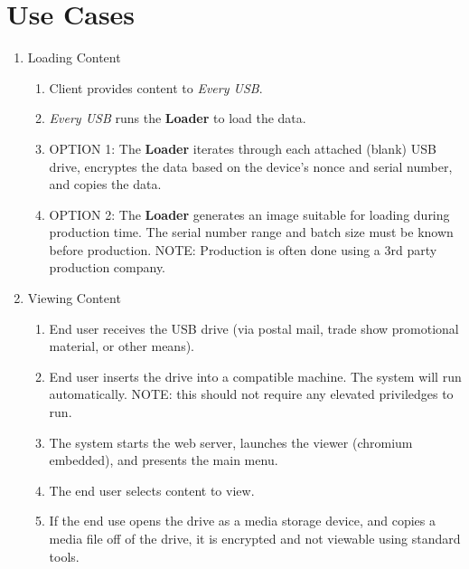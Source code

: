 \documentclass{article}
\begin{document}
\section{Use Cases}

\begin{enumerate}
\item Loading Content
    \begin{enumerate}
    \item Client provides content to {\it Every USB}.
    \item {\it Every USB} runs the {\bf Loader} to load the data.
    \item OPTION 1: The {\bf Loader} iterates through each attached
          (blank) USB drive, encryptes the data based on the device's nonce
          and serial number, and copies the data.
    \item OPTION 2: The {\bf Loader} generates an image suitable for
          loading during production time.  The serial number range and
          batch size must be known before production.  NOTE: Production
          is often done using a 3rd party production company.
    \end{enumerate}

\item Viewing Content
    \begin{enumerate}
    \item End user receives the USB drive (via postal mail, trade show 
          promotional material, or other means).
    \item End user inserts the drive into a compatible machine.  The 
          system will run automatically.  NOTE: this should not require
          any elevated priviledges to run.
    \item The system starts the web server, launches the viewer (chromium
          embedded), and presents the main menu.
    \item The end user selects content to view.
    \item If the end use opens the drive as a media storage device, and 
          copies a media file off of the drive, it is encrypted and not
          viewable using standard tools.
    \end{enumerate}

\end{enumerate}
\end{document}
